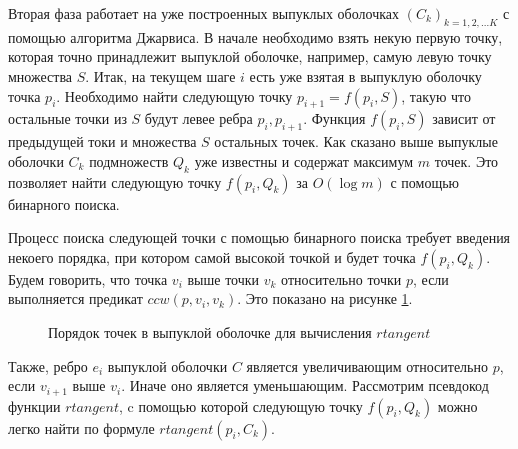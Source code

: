 Вторая фаза работает на уже построенных выпуклых оболочках $(C_k)_{k=1,2,...K}$ с помощью алгоритма Джарвиса. В начале необходимо взять некую первую точку, которая точно принадлежит выпуклой оболочке, например, самую левую точку множества $S$. Итак, на текущем шаге $i$ есть уже взятая в выпуклую оболочку точка $p_i$. Необходимо найти следующую точку $p_{i + 1} = f(p_i, S)$, такую что остальные точки из $S$ будут левее ребра $p_i, p_{i+1}$. Функция $f(p_i, S)$ зависит от предыдущей токи и множества $S$ остальных точек. Как сказано выше выпуклые оболочки $C_k$ подмножеств $Q_k$ уже известны и содержат максимум $m$ точек. Это позволяет найти следующую точку $f(p_i, Q_k)$ за $O(\log m)$ с помощью бинарного поиска.

Процесс поиска следующей точки с помощью бинарного поиска требует введения некоего порядка, при котором самой высокой точкой и будет точка $f(p_i, Q_k)$. Будем говорить, что точка $v_i$ выше точки $v_k$ относительно точки $p$, если выполняется предикат $ccw(p, v_i, v_k)$. Это показано на рисунке \ref{img:rtangent}.

\begin{figure}
	\centering
	
	\caption{Порядок точек в выпуклой оболочке для вычисления $rtangent$}
	\label{img:rtangent}
\end{figure}

Также, ребро $e_i$ выпуклой оболочки $C$ является увеличивающим относительно $p$, если $v_{i+1}$ выше $v_i$. Иначе оно является уменьшающим\cite{geomal2012tangents}. Рассмотрим псевдокод функции $rtangent$, c помощью которой следующую точку $f(p_i, Q_k)$ можно легко найти по формуле $rtangent(p_i, C_k)$.


